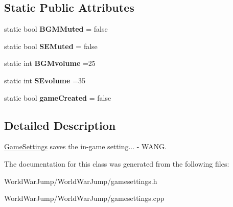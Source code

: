 \subsection*{Static Public Attributes}
\begin{DoxyCompactItemize}
\item 
static bool {\bfseries B\+G\+M\+Muted} = false\hypertarget{class_game_settings_a87e3bb0896d1bb44e7797df275b1f1ab}{}\label{class_game_settings_a87e3bb0896d1bb44e7797df275b1f1ab}

\item 
static bool {\bfseries S\+E\+Muted} = false\hypertarget{class_game_settings_a6945f286363960c2331bbcb4ec758e43}{}\label{class_game_settings_a6945f286363960c2331bbcb4ec758e43}

\item 
static int {\bfseries B\+G\+Mvolume} =25\hypertarget{class_game_settings_a5fc95f4ae14129aec1b0bd02996c22df}{}\label{class_game_settings_a5fc95f4ae14129aec1b0bd02996c22df}

\item 
static int {\bfseries S\+Evolume} =35\hypertarget{class_game_settings_a4077fc804506698a19d5f1c4878c95ff}{}\label{class_game_settings_a4077fc804506698a19d5f1c4878c95ff}

\item 
static bool {\bfseries game\+Created} = false\hypertarget{class_game_settings_a8e4eaa1eef1419e3d25660d57ee51b7c}{}\label{class_game_settings_a8e4eaa1eef1419e3d25660d57ee51b7c}

\end{DoxyCompactItemize}


\subsection{Detailed Description}
\hyperlink{class_game_settings}{Game\+Settings} saves the in-\/game setting... -\/ W\+A\+NG. 

The documentation for this class was generated from the following files\+:\begin{DoxyCompactItemize}
\item 
World\+War\+Jump/\+World\+War\+Jump/gamesettings.\+h\item 
World\+War\+Jump/\+World\+War\+Jump/gamesettings.\+cpp\end{DoxyCompactItemize}
